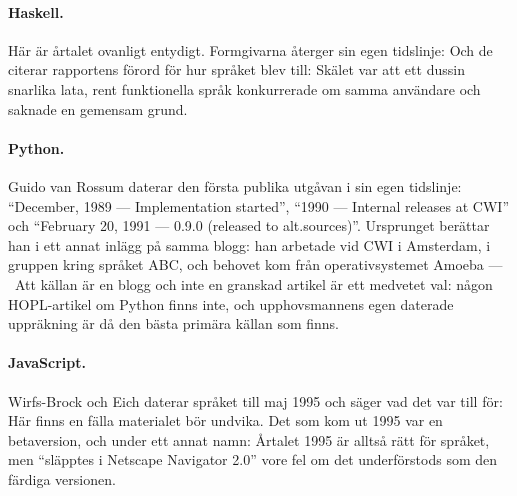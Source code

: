 \paragraph{Haskell.}  Här är årtalet ovanligt entydigt.  Formgivarna
återger sin egen tidslinje:   Och de citerar rapportens förord för hur språket blev till:
  Skälet var att ett dussin snarlika
lata, rent funktionella språk konkurrerade om samma användare och saknade
en gemensam grund.

\paragraph{Python.}  Guido van Rossum daterar den första publika utgåvan i
sin egen tidslinje: \enquote{December, 1989 --- Implementation started},
\enquote{1990 --- Internal releases at CWI} och \enquote{February 20, 1991
--- 0.9.0 (released to alt.sources)}\autocite{VanRossum1991Python}.
Ursprunget berättar han i ett annat inlägg på samma blogg: han arbetade
vid CWI i Amsterdam, i gruppen kring språket ABC, och behovet kom från
operativsystemet Amoeba --- \ Att källan är en blogg och inte en granskad artikel är ett
medvetet val: någon HOPL-artikel om Python finns inte, och upphovsmannens
egen daterade uppräkning är då den bästa primära källan som finns.

\paragraph{JavaScript.}  Wirfs-Brock och Eich daterar språket till maj 1995
och säger vad det var till för:
  Här finns en fälla materialet bör undvika.
Det som kom ut 1995 var en betaversion, och under ett annat namn:
Årtalet 1995 är alltså rätt för språket, men \enquote{släpptes i Netscape
Navigator 2.0} vore fel om det underförstods som den färdiga versionen.

